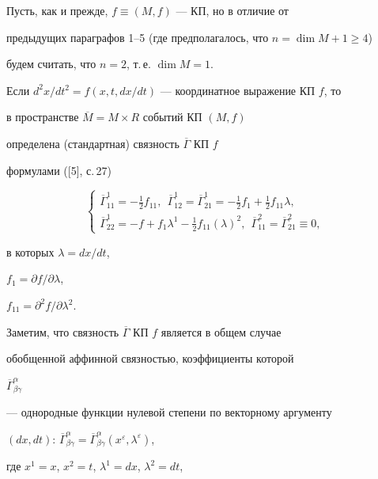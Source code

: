 Пусть, как и прежде, $f\equiv (M,f) $ --- КП, но в отличие от


предыдущих параграфов 1--5 (где предполагалось, что $n=\dim M+1\geq 4$)


будем считать, что $n=2$, т.\,е. $\dim M=1$.





Если $d^2x/dt^2=f(x,t,dx/dt)$ --- координатное выражение КП $f$, то


в пространстве $\overline{M} =M\times R $ событий КП $(M,f) $


определена (стандартная) связность $\overline{\Gamma} $ КП $f$


формулами ([5], с.\,27)


$$


\begin{cases}


\overline{\Gamma}^{1}_{11}=-\frac{1}{2}f_{11},\ \ 


\overline{\Gamma}^{1}_{12}=\overline{\Gamma}^{1}_{21}=-\frac{1}{2}f_{1}


+\frac{1}{2}f_{11}\lambda,\\


\overline{\Gamma}^{1}_{22}=-f+f_1 \lambda^1 -\frac{1}{2}f_{11}(\lambda)^2,


\ \ \overline{\Gamma}^{2}_{11}=\overline{\Gamma}^{2}_{21}\equiv 0,


\end{cases}


$$


в которых $\lambda=dx/dt$,


$f_1=\partial f/\partial \lambda $,


$f_{11}=\partial^2f/\partial \lambda^2$.





Заметим, что связность $\overline{\Gamma} $ КП $f$ является в общем случае


обобщенной аффинной связностью, коэффициенты которой


$\overline{\Gamma}^{\alpha}_{\beta \gamma} $


--- однородные функции нулевой степени по векторному аргументу


$(dx,dt)$: $\overline{\Gamma}^{\alpha}_{\beta \gamma}


=\overline{\Gamma}^{\alpha}_{\beta \gamma}


(x^{\varepsilon},\lambda^\varepsilon)$,


где $x^1=x$, $x^2=t$, $\lambda^1=dx$, $\lambda^2=dt$,


